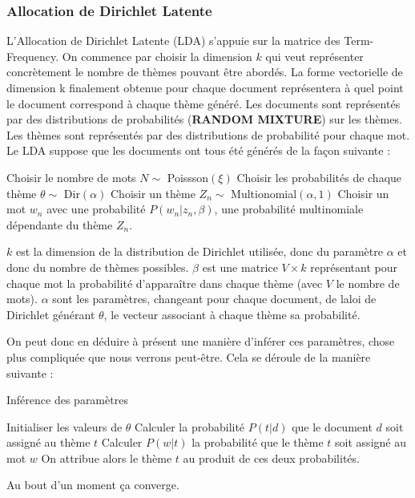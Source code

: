 \subsubsection{Allocation de Dirichlet Latente}
L'Allocation de Dirichlet Latente (LDA) s'appuie sur la matrice des Term-Frequency. On commence par choisir la dimension $k$ qui veut représenter concrètement le nombre de thèmes pouvant être abordés. La forme vectorielle de dimension k finalement obtenue pour chaque document représentera à quel point le document correspond à chaque thème généré. Les documents sont représentés par des distributions de probabilités (\textbf{RANDOM MIXTURE}) sur les thèmes. Les thèmes sont représentés par des distributions de probabilité pour chaque mot. 
Le LDA suppose que les documents ont tous été générés de la façon suivante :

\begin{algorithmic}
\STATE Choisir le nombre de mots $N \sim$ Poissson$(\xi)$
\STATE Choisir les probabilités de chaque thème $\theta \sim$ Dir$(\alpha)$
	\STATE Choisir un thème $Z_n \sim$ Multionomial$(\alpha,1)$
	\STATE Choisir un mot $w_n$ avec une probabilité $P(w_n | z_n , \beta)$, une probabilité multinomiale dépendante du thème $Z_n$.
\ENDFOR
\end{algorithmic}
$k$ est la dimension de la distribution de Dirichlet utilisée, donc du paramètre $\alpha$ et donc du nombre de thèmes possibles. $\beta$ est une matrice $V \times k$ représentant pour chaque mot la probabilité d'apparaître dans chaque thème  (avec $V$ le nombre de mots). $\alpha$ sont les paramètres, changeant pour chaque document, de laloi de Dirichlet générant $\theta$, le vecteur associant à chaque thème sa probabilité. 

On peut donc en déduire à présent une manière d'inférer ces paramètres, chose plus compliquée que nous verrons peut-être. Cela se déroule de la manière suivante : 
\begin{algorithm}
\caption{Inférence des paramètres}
\begin{algorithmic}
\STATE Initialiser les valeurs de $\theta$
		\STATE Calculer la probabilité $P(t|d)$ que le document $d$ soit assigné au thème $t$
		\STATE Calculer $P(w|t)$ la probabilité que le thème $t$ soit assigné au mot $w$
		\STATE On attribue alors le thème $t$ au produit de ces deux probabilités.
	\ENDFOR
\ENDFOR
\end{algorithmic}
\end{algorithm}
Au bout d'un moment ça converge.
